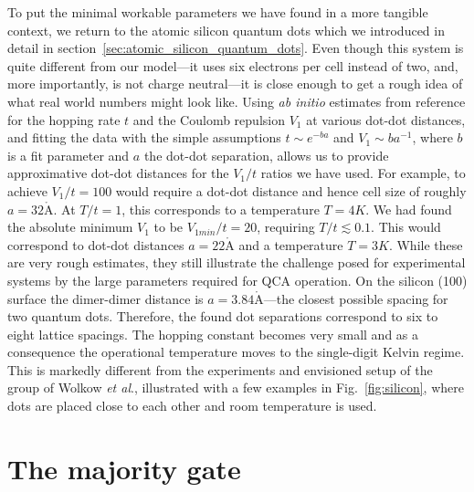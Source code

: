 To put the minimal workable parameters we have found in a more tangible context,
we return to the atomic silicon quantum dots which we introduced in detail in
section~\ref{sec:atomic_silicon_quantum_dots}. Even though this system is quite
different from our model---it uses six electrons per cell instead of two, and,
more importantly, is not charge neutral---it is close enough to get a rough idea
of what real world numbers might look like. Using \emph{ab initio} estimates
from reference \cite{pitters2011tunnel} for the hopping rate $t$ and the Coulomb
repulsion $V_1$ at various dot-dot distances, and fitting the data with the
simple assumptions $t \sim e^{-b a}$ and $V_1 \sim b a^{-1}$, where $b$ is a fit
parameter and $a$ the dot-dot separation, allows us to provide approximative
dot-dot distances for the $V_1/t$ ratios we have used. For example, to achieve
$V_1/t = 100$ would require a dot-dot distance and hence cell size of roughly $a
= 32 \mathring{\mathrm{A}}$. At $T/t = 1$, this corresponds to a temperature $T
= 4K$. We had found the absolute minimum $V_1$ to be $V_{1min}/t = 20$,
requiring $T/t \lesssim 0.1$. This would correspond to dot-dot distances $a = 22
\mathring{\mathrm{A}}$ and a temperature $T = 3 K$. While these are very rough
estimates, they still illustrate the challenge posed for experimental systems by
the large parameters required for QCA operation. On the silicon (100) surface
the dimer-dimer distance is $a = 3.84 \mathring{\mathrm{A}}$---the closest
possible spacing for two quantum dots. Therefore, the found dot separations
correspond to six to eight lattice spacings. The hopping constant becomes very
small and as a consequence the operational temperature moves to the single-digit
Kelvin regime. This is markedly different from the experiments and envisioned
setup of the group of Wolkow \emph{et al}., illustrated with a few examples in
Fig.~\ref{fig:silicon}, where dots are placed close to each other and room
temperature is used.

\clearpage


\section{The majority gate}

